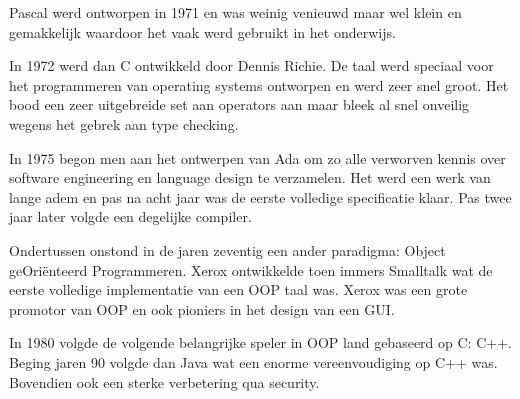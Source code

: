 \documentclass[../main.tex]{subfiles}
\begin{document}
\begin{solution}
Pascal werd ontworpen in 1971 en was weinig venieuwd maar wel klein en gemakkelijk waardoor het vaak werd gebruikt in het onderwijs.

In 1972 werd dan C ontwikkeld door Dennis Richie.
De taal werd speciaal voor het programmeren van operating systems ontworpen en werd zeer snel groot.
Het bood een zeer uitgebreide set aan operators aan maar bleek al snel onveilig wegens het gebrek aan type checking.

In 1975 begon men aan het ontwerpen van Ada om zo alle verworven kennis over software engineering en language design te verzamelen.
Het werd een werk van lange adem en pas na acht jaar was de eerste volledige specificatie klaar.
Pas twee jaar later volgde een degelijke compiler.

Ondertussen onstond in de jaren zeventig een ander paradigma: Object geOri\"enteerd Programmeren.
Xerox ontwikkelde toen immers Smalltalk wat de eerste volledige implementatie van een OOP taal was.
Xerox was een grote promotor van OOP en ook  pioniers in het design van een GUI.

In 1980 volgde de volgende belangrijke speler in OOP land gebaseerd op C: C++.
Beging jaren 90 volgde dan Java wat een enorme vereenvoudiging op C++ was.
Bovendien ook een sterke verbetering qua security.

\end{solution}
\end{document}
